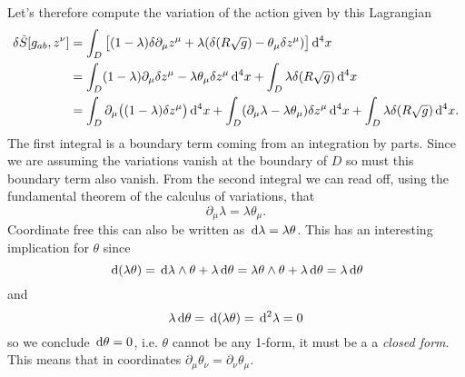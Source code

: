 \documentclass[../main.tex]{subfiles}
\begin{document}
Let's therefore compute the variation of the action given by this Lagrangian
\begin{align}
	\delta \tilde{S}[g_{ab}, z^\nu] & = \int_D \big[(1-\lambda) \delta \partial_\mu z^\mu +
	\lambda(\delta(R\sqrt{g}) - \theta_\mu \delta z^\mu)\big] \,\mathrm{d}^4 x \notag \\
																	& = \int_D (1 - \lambda) \partial_\mu \delta z^\mu -
																	\lambda \theta_\mu \delta z^\mu \,\mathrm{d}^4x + \int_D \lambda
																	\delta(R \sqrt{g}) \,\mathrm{d}^4 x \notag \\
																	& = \int_{D} \partial_\mu \big((1 -
																	\lambda)\delta z^\mu\big) \,\mathrm{d}^4 x + \int_D (\partial_\mu \lambda
																	- \lambda\theta_\mu) \delta z^\mu \,\mathrm{d}^4 x + \int_D \lambda
																	\delta(R \sqrt{g}) \,\mathrm{d}^4 x \label{eq:variation expanded
																	action}. 
\end{align}
The first integral is a boundary term coming from an integration by parts. Since we are
assuming the variations vanish at the boundary of \( D \) so must this boundary term also
vanish. From the second integral we can read off, using the fundamental theorem of the
calculus of variations, that
\begin{equation} \label{eq:action flux variation}
	\partial_\mu \lambda = \lambda\theta_\mu.
\end{equation}
Coordinate free this can also be written as \( \,\mathrm{d} \lambda = \lambda \theta \). This has
an interesting implication for \( \theta \) since
\begin{equation*}
	\,\mathrm{d}(\lambda \theta) = \,\mathrm{d} \lambda \wedge \theta + \lambda \,\mathrm{d} \theta = \lambda \theta
	\wedge \theta + \lambda \,\mathrm{d} \theta = \lambda \,\mathrm{d} \theta
\end{equation*}
and 
\begin{equation*}
	\lambda \,\mathrm{d} \theta = \,\mathrm{d}(\lambda \theta) = \,\mathrm{d}^2 \lambda = 0
\end{equation*}
so we conclude \( \,\mathrm{d} \theta = 0 \), i.e. \( \theta \) cannot be any 1-form, it must be a
a \emph{closed form}. This means that in coordinates \( \partial_\mu \theta_\nu =
\partial_\nu \theta_\mu \). 
\end{document}
